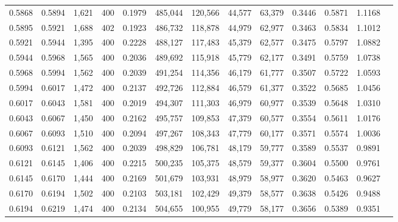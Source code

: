 \begin{tabular}{rrrrrrrrrrrrr}
0.5868 & 0.5894 &  1,621 &   400 &                                     0.1979 & 485,044 & 120,566 &  44,577 &  63,379 & 0.3446 & 0.5871 & 1.1168 \\
0.5895 & 0.5921 &  1,688 &   402 &                                     0.1923 & 486,732 & 118,878 &  44,979 &  62,977 & 0.3463 & 0.5834 & 1.1012 \\
0.5921 & 0.5944 &  1,395 &   400 &                                     0.2228 & 488,127 & 117,483 &  45,379 &  62,577 & 0.3475 & 0.5797 & 1.0882 \\
0.5944 & 0.5968 &  1,565 &   400 &                                     0.2036 & 489,692 & 115,918 &  45,779 &  62,177 & 0.3491 & 0.5759 & 1.0738 \\
0.5968 & 0.5994 &  1,562 &   400 &                                     0.2039 & 491,254 & 114,356 &  46,179 &  61,777 & 0.3507 & 0.5722 & 1.0593 \\
0.5994 & 0.6017 &  1,472 &   400 &                                     0.2137 & 492,726 & 112,884 &  46,579 &  61,377 & 0.3522 & 0.5685 & 1.0456 \\
0.6017 & 0.6043 &  1,581 &   400 &                                     0.2019 & 494,307 & 111,303 &  46,979 &  60,977 & 0.3539 & 0.5648 & 1.0310 \\
0.6043 & 0.6067 &  1,450 &   400 &                                     0.2162 & 495,757 & 109,853 &  47,379 &  60,577 & 0.3554 & 0.5611 & 1.0176 \\
0.6067 & 0.6093 &  1,510 &   400 &                                     0.2094 & 497,267 & 108,343 &  47,779 &  60,177 & 0.3571 & 0.5574 & 1.0036 \\
0.6093 & 0.6121 &  1,562 &   400 &                                     0.2039 & 498,829 & 106,781 &  48,179 &  59,777 & 0.3589 & 0.5537 & 0.9891 \\
0.6121 & 0.6145 &  1,406 &   400 &                                     0.2215 & 500,235 & 105,375 &  48,579 &  59,377 & 0.3604 & 0.5500 & 0.9761 \\
0.6145 & 0.6170 &  1,444 &   400 &                                     0.2169 & 501,679 & 103,931 &  48,979 &  58,977 & 0.3620 & 0.5463 & 0.9627 \\
0.6170 & 0.6194 &  1,502 &   400 &                                     0.2103 & 503,181 & 102,429 &  49,379 &  58,577 & 0.3638 & 0.5426 & 0.9488 \\
0.6194 & 0.6219 &  1,474 &   400 &                                     0.2134 & 504,655 & 100,955 &  49,779 &  58,177 & 0.3656 & 0.5389 & 0.9351 \\

\end{tabular}
